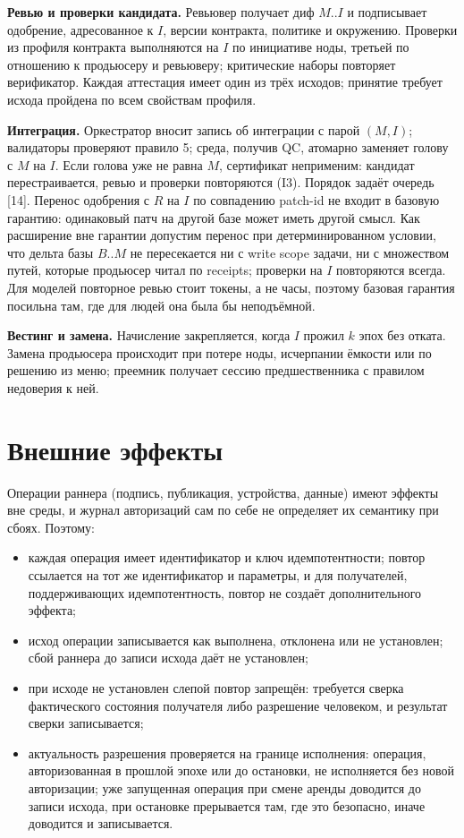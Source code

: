 \documentclass[11pt,a4paper]{article}
\begin{document}
\textbf{Ревью и проверки кандидата.} Ревьювер получает диф $M..I$ и подписывает одобрение, адресованное к $I$, версии контракта, политике и окружению. Проверки из профиля контракта выполняются на $I$ по инициативе ноды, третьей по отношению к продьюсеру и ревьюверу; критические наборы повторяет верификатор. Каждая аттестация имеет один из трёх исходов; принятие требует исхода пройдена по всем свойствам профиля.

\textbf{Интеграция.} Оркестратор вносит запись об интеграции с парой $(M, I)$; валидаторы проверяют правило 5; среда, получив QC, атомарно заменяет голову с $M$ на $I$. Если голова уже не равна $M$, сертификат неприменим: кандидат перестраивается, ревью и проверки повторяются (I3). Порядок задаёт очередь [14]. Перенос одобрения с $R$ на $I$ по совпадению patch-id не входит в базовую гарантию: одинаковый патч на другой базе может иметь другой смысл. Как расширение вне гарантии допустим перенос при детерминированном условии, что дельта базы $B..M$ не пересекается ни с write scope задачи, ни с множеством путей, которые продьюсер читал по receipts; проверки на $I$ повторяются всегда. Для моделей повторное ревью стоит токены, а не часы, поэтому базовая гарантия посильна там, где для людей она была бы неподъёмной.

\textbf{Вестинг и замена.} Начисление закрепляется, когда $I$ прожил $k$ эпох без отката. Замена продьюсера происходит при потере ноды, исчерпании ёмкости или по решению из меню; преемник получает сессию предшественника с правилом недоверия к ней.

\section{Внешние эффекты}

Операции раннера (подпись, публикация, устройства, данные) имеют эффекты вне среды, и журнал авторизаций сам по себе не определяет их семантику при сбоях. Поэтому:

\begin{itemize}
\item каждая операция имеет идентификатор и ключ идемпотентности; повтор ссылается на тот же идентификатор и параметры, и для получателей, поддерживающих идемпотентность, повтор не создаёт дополнительного эффекта;
\item исход операции записывается как выполнена, отклонена или не установлен; сбой раннера до записи исхода даёт не установлен;
\item при исходе не установлен слепой повтор запрещён: требуется сверка фактического состояния получателя либо разрешение человеком, и результат сверки записывается;
\item актуальность разрешения проверяется на границе исполнения: операция, авторизованная в прошлой эпохе или до остановки, не исполняется без новой авторизации; уже запущенная операция при смене аренды доводится до записи исхода, при остановке прерывается там, где это безопасно, иначе доводится и записывается.
\end{itemize}
\end{document}

